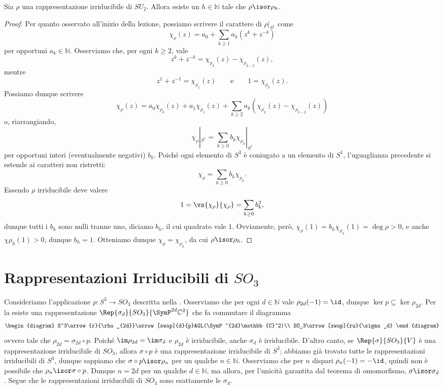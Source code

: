 \begin{proposition}
Sia $\rho$ una rappresentazione irriducibile di $SU_2$. Allora esiste un $h\in\mathbb{N}$ tale che $\rho\isor\rho_h$.
\end{proposition}
\begin{proof}
Per quanto osservato all'inizio della lezione, possiamo scrivere il carattere di $\rho|_{S^1}$ come
$$
\chi_\rho(z)=a_0+\sum_{k\ge 1}a_k(z^k+z^{-k})
$$
per opportuni $a_k\in\mathbb{N}$. Osserviamo che, per ogni $k\ge 2$, vale 
$$
z^k+z^{-k}=\chi_{\rho_k}(z)-\chi_{\rho_{k-2}}(z),
$$
mentre
$$
z^1+z^{-1}=\chi_{\rho_1}(z)\qquad\text{e}\qquad 1=\chi_{\rho_0}(z).
$$
Possiamo dunque scrivere
$$
\chi_\rho(z)=a_0\chi_{\rho_0}(z)+a_1\chi_{\rho_1}(z)+\sum_{k\ge 2}a_k(\chi_{\rho_k}(z)-\chi_{\rho_{k-2}}(z))
$$
o, riarrangiando,
$$
\chi_\rho|_{S^1}=\sum_{k\ge 0}b_k\chi_{\rho_k}|_{S^1}
$$
per opportuni interi (eventualmente negativi) $b_k$. Poiché ogni elemento di $S^3$ è coniugato a un elemento di $S^1$, l'uguaglianza precedente si estende ai caratteri non ristretti:
$$
\chi_\rho=\sum_{k\ge 0}b_k\chi_{\rho_k}.
$$
Essendo $\rho$ irriducibile deve valere
$$
1=\vs{\chi_\rho}{\chi_\rho}=\sum_{k\ge 0}b_k^2,
$$
dunque tutti i $b_k$ sono nulli tranne uno, diciamo $b_h$, il cui quadrato vale $1$. Ovviamente, però, $\chi_\rho(1)=b_h\chi_{\rho_h}(1)=\deg\rho>0$, e anche $\chi{\rho_h}(1)>0$, dunque $b_h=1$. Otteniamo dunque $\chi_\rho=\chi_{\rho_h}$, da cui $\rho\isor\rho_h$.
\end{proof}

\section{Rappresentazioni Irriducibili di $SO_3$}
Consideriamo l'applicazione $p:S^3\to SO_3$ descritta nella . Osserviamo che per ogni $d\in\mathbb{N}$ vale $\rho_{2d}(-1)=\id$, dunque $\ker p\subseteq\ker\rho_{2d}$. Per la  esiste una rappresentazione $\Rep{\sigma_d}{SO_3}{\SymP^{2d}\mathbb{C}^2}$ che fa commutare il diagramma
$$
\begin{diagram}
S^3\arrow{r}{\rho_{2d}}\arrow[swap]{d}{p}&GL(\SymP^{2d}\mathbb{C}^2)\\
SO_3\arrow[swap]{ru}{\sigma_d}
\end{diagram}
$$
ovvero tale che $\rho_{2d}=\sigma_{2d}\circ p$. Poiché $\im\rho_{2d}=\im\sigma_d$ e $\rho_{2d}$ è irriducibile, anche $\sigma_d$ è irriducibile. D'altro canto, se $\Rep{\sigma}{SO_3}{V}$ è una rappresentazione irriducibile di $SO_3$, allora $\sigma\circ p$ è una rappresentazione irriducibile di $S^3$; abbiamo già trovato tutte le rappresentazioni irriducibili di $S^3$, dunque sappiamo che $\sigma\circ p\isor\rho_n$ per un qualche $n\in\mathbb{N}$. Osserviamo che per $n$ dispari $\rho_n(-1)=-\id$, quindi non è possibile che $\rho_n\isor\sigma\circ p$. Dunque $n=2d$ per un qualche $d\in\mathbb{N}$, ma allora, per l'unicità garantita dal teorema di omomorfismo, $\sigma\isor\sigma_d$. Segue che le rappresentazioni irriducibili di $SO_3$ sono esattamente le $\sigma_d$.

